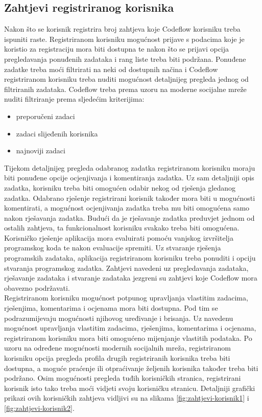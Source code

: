 \documentclass[times, utf8, zavrsni]{fer}
\begin{document}
		\subsection{Zahtjevi registriranog korisnika}
		Nakon što se korisnik registrira broj zahtjeva koje Codeflow korisniku treba ispuniti raste. Registriranom korisniku mogućnost prijave s podacima koje je koristio za registraciju mora biti dostupna te nakon što se prijavi opcija pregledavanja ponuđenih zadataka i rang liste treba biti podržana. Ponuđene zadatke treba moći filtrirati na neki od dostupnih načina i Codeflow registriranom korisniku treba nuditi mogućnost detaljnijeg pregleda jednog od filtriranih zadataka. Codeflow treba prema uzoru na moderne socijalne mreže nuditi filtriranje prema sljedećim kriterijima: 
		\begin{itemize}
			\item preporučeni zadaci
			\item zadaci slijeđenih korisnika
			\item najnoviji zadaci
		\end{itemize}
		Tijekom detaljnijeg pregleda odabranog zadatka registriranom korisniku moraju biti ponuđene opcije ocjenjivanja i komentiranja zadatka. Uz sam detaljniji opis zadatka, korisniku treba biti omogućen odabir nekog od rješenja gledanog zadatka. Odabrano rješenje registrirani korisnik također mora biti u mogućnosti komentirati, a mogućnost ocjenjivanja zadatka treba mu biti omogućena samo nakon rješavanja zadatka. Budući da je rješavanje zadatka preduvjet jednom od ostalih zahtjeva, ta funkcionalnost  korisniku svakako treba biti omogućena. Korisničko rješenje aplikacija mora evaluirati pomoću vanjskog izvršitelja programskog koda te nakon evaluacije spremiti. Uz stvaranje rješenja programskih zadataka, aplikacija registriranom korisniku treba ponuditi i opciju stvaranja programskog zadatka. Zahtjevi navedeni uz pregledavanja zadataka, rješavanje zadataka i stvaranje zadataka jezgreni su zahtjevi koje Codeflow mora obavezno podržavati.\\ Registriranom korisniku mogućnost potpunog upravljanja vlastitim zadacima, rješenjima, komentarima i ocjenama mora biti dostupna. Pod tim se podrazumijevaju  mogućnosti njihovog uređivanje i brisanja. Uz navedenu mogućnost upravljanja vlastitim zadacima, rješenjima, komentarima i ocjenama, registriranom korisniku mora biti omogućeno mijenjanje vlastitih podataka. Po uzoru na određene mogućnosti modernih socijalnih mreža, registriranom korisniku opcija pregleda profila drugih registriranih korisnika treba biti dostupna, a moguće praćenje ili otpraćivanje željenih korisnika također treba biti podržano. Osim mogućnosti pregleda tuđih korisničkih stranica, registrirani korisnik isto tako treba moći vidjeti svoju korisničku stranicu. Detaljniji grafički prikazi ovih korisničkih zahtjeva vidljivi su na slikama \ref{fig:zahtjevi-korisnik1} i \ref{fig:zahtjevi-korisnik2}.
		
\end{document}
